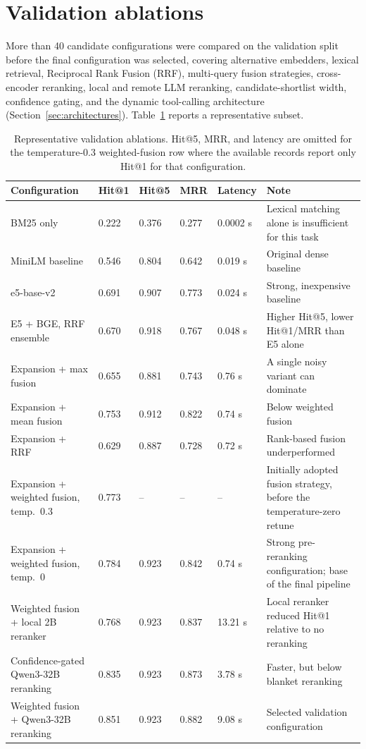 \section{Validation ablations}
\label{sec:ablations}

More than 40 candidate configurations were compared on the validation split before the final configuration was selected, covering alternative embedders, lexical retrieval, Reciprocal Rank Fusion (RRF), multi-query fusion strategies, cross-encoder reranking, local and remote LLM reranking, candidate-shortlist width, confidence gating, and the dynamic tool-calling architecture (Section~\ref{sec:architectures}). Table~\ref{tab:ablations} reports a representative subset.

\begingroup
\footnotesize
\begin{table}[htbp]
\centering
\setlength{\tabcolsep}{4pt}
\begin{tabular}{p{4.2cm}p{0.9cm}p{0.9cm}p{0.9cm}p{1.2cm}p{4.0cm}}
\toprule
\textbf{Configuration} & \textbf{Hit@1} & \textbf{Hit@5} & \textbf{MRR} & \textbf{Latency} & \textbf{Note}\\
\midrule
BM25 only & 0.222 & 0.376 & 0.277 & 0.0002 s & Lexical matching alone is insufficient for this task\\
MiniLM baseline & 0.546 & 0.804 & 0.642 & 0.019 s & Original dense baseline\\
e5-base-v2 & 0.691 & 0.907 & 0.773 & 0.024 s & Strong, inexpensive baseline\\
E5 + BGE, RRF ensemble & 0.670 & 0.918 & 0.767 & 0.048 s & Higher Hit@5, lower Hit@1/MRR than E5 alone\\
Expansion + max fusion & 0.655 & 0.881 & 0.743 & 0.76 s & A single noisy variant can dominate\\
Expansion + mean fusion & 0.753 & 0.912 & 0.822 & 0.74 s & Below weighted fusion\\
Expansion + RRF & 0.629 & 0.887 & 0.728 & 0.72 s & Rank-based fusion underperformed\\
Expansion + weighted fusion, temp.\ 0.3 & 0.773 & -- & -- & -- & Initially adopted fusion strategy, before the temperature-zero retune\\
Expansion + weighted fusion, temp.\ 0 & 0.784 & 0.923 & 0.842 & 0.74 s & Strong pre-reranking configuration; base of the final pipeline\\
Weighted fusion + local 2B reranker & 0.768 & 0.923 & 0.837 & 13.21 s & Local reranker reduced Hit@1 relative to no reranking\\
Confidence-gated Qwen3-32B reranking & 0.835 & 0.923 & 0.873 & 3.78 s & Faster, but below blanket reranking\\
Weighted fusion + Qwen3-32B reranking & 0.851 & 0.923 & 0.882 & 9.08 s & Selected validation configuration\\
\bottomrule
\end{tabular}
\caption{Representative validation ablations. Hit@5, MRR, and latency are omitted for the temperature-0.3 weighted-fusion row where the available records report only Hit@1 for that configuration.}
\label{tab:ablations}
\end{table}
\endgroup

